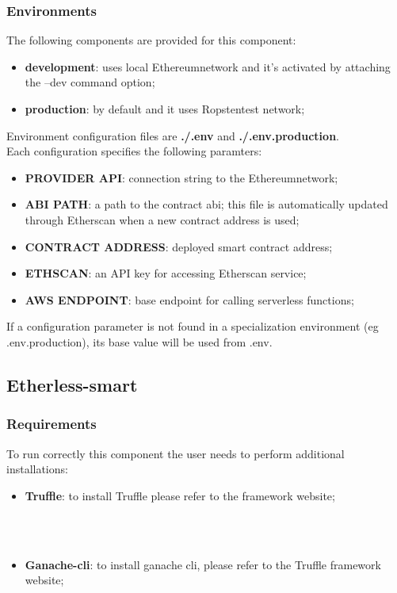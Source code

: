\subsubsection{Environments}
The following components are provided for this component:
\begin{itemize}
	\item \textbf{development}: uses local Ethereum\glo network and it's activated by attaching the --dev command option;
	\item \textbf{production}: by default and it uses Ropsten\glo test network;
\end{itemize}
Environment configuration files are \textbf{./.env} and \textbf{./.env.production}.
\\Each configuration specifies the following paramters:
\begin{itemize}
	\item \textbf{PROVIDER API}: connection string to the Ethereum\glo network;
	\item \textbf{ABI PATH}: a path to the contract abi; this file is automatically updated through Etherscan when a new contract address is used;
	\item \textbf{CONTRACT ADDRESS}: deployed smart contract address;
	\item \textbf{ETHSCAN}: an API key for accessing Etherscan service;
	\item \textbf{AWS ENDPOINT}: base endpoint for calling serverless functions;
\end{itemize}
If a configuration parameter is not found in a specialization environment (eg .env.production), its base value will be used from .env.
\subsection{Etherless-smart}
\subsubsection{Requirements}
To run correctly this component the user needs to perform additional installations:
\begin{itemize}
    \item \textbf{Truffle}: to install Truffle please refer to the framework website; \\\\\centerline{}\\
    \item \textbf{Ganache-cli}: to install ganache cli, please refer to the Truffle framework website;  \\\\\centerline{}
\end{itemize}

